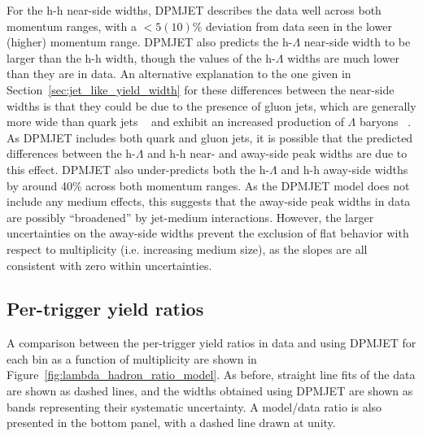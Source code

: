 For the h-h near-side widths, DPMJET describes the data well across both momentum ranges, with a $<5 (10)$\%  deviation from data seen in the lower (higher) momentum range. DPMJET also predicts the h-$\Lambda$ near-side width to be larger than the h-h width, though the values of the h-$\Lambda$ widths are much lower than they are in data. An alternative explanation to the one given in Section~\ref{sec:jet_like_yield_width} for these differences between the near-side widths is that they could be due to the presence of gluon jets, which are generally more wide than quark jets ~\cite{GluonJet1} and exhibit an increased production of $\Lambda$ baryons ~\cite{GluonJet2}. As DPMJET includes both quark and gluon jets, it is possible that the predicted differences between the h-$\Lambda$ and h-h near- and away-side peak widths are due to this effect. DPMJET also under-predicts both the h-$\Lambda$ and h-h away-side widths by around 40\% across both momentum ranges. As the DPMJET model does not include any medium effects, this suggests that the away-side peak widths in data are possibly ``broadened'' by jet-medium interactions. However, the larger uncertainties on the away-side widths prevent the exclusion of flat behavior with respect to multiplicity (i.e. increasing medium size), as the slopes are all consistent with zero within uncertainties.

\subsection{Per-trigger yield ratios}
\label{sec:ratios_modelcomp}

 A comparison between the per-trigger yield ratios in data and using DPMJET for each \pt bin as a function of multiplicity are shown in Figure~\ref{fig:lambda_hadron_ratio_model}. As before, straight line fits of the data are shown as dashed lines, and the widths obtained using DPMJET are shown as bands representing their systematic uncertainty. A model/data ratio is also presented in the bottom panel, with a dashed line drawn at unity.

